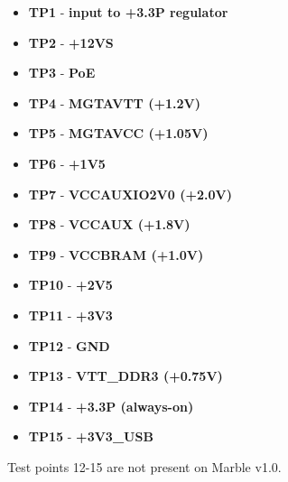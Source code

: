 \documentclass[12pt,oneside,a4]{article}
\begin{document}
\begin{itemize}
	\item \textbf{TP1} - \textbf{input to +3.3P regulator}
	\item \textbf{TP2} - \textbf{+12VS}
	\item \textbf{TP3} - \textbf{PoE}
	\item \textbf{TP4} - \textbf{MGTAVTT (+1.2V)}
	\item \textbf{TP5} - \textbf{MGTAVCC (+1.05V)}
	\item \textbf{TP6} - \textbf{+1V5}
	\item \textbf{TP7} - \textbf{VCCAUXIO2V0 (+2.0V)}
	\item \textbf{TP8} - \textbf{VCCAUX (+1.8V)}
	\item \textbf{TP9} - \textbf{VCCBRAM (+1.0V)}
	\item \textbf{TP10} - \textbf{+2V5}
	\item \textbf{TP11} - \textbf{+3V3}
	\item \textbf{TP12} - \textbf{GND}
	\item \textbf{TP13} - \textbf{VTT\_DDR3 (+0.75V)}
	\item \textbf{TP14} - \textbf{+3.3P (always-on)}
	\item \textbf{TP15} - \textbf{+3V3\_USB}

\end{itemize}

Test points 12-15 are not present on Marble v1.0.

\begin{thebibliography}{99}
\end{thebibliography}
\end{document}
